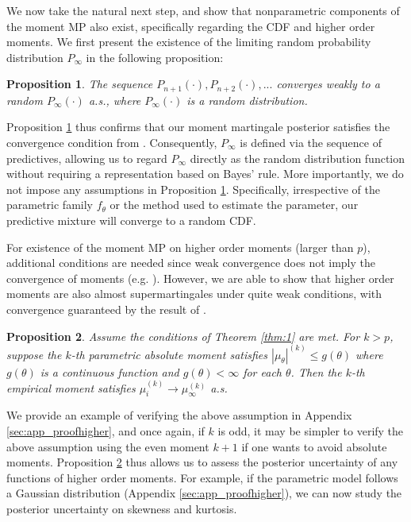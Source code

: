 \documentclass[11pt,a4paper]{article}
\theoremstyle{plain}
\newtheorem{prop}{Proposition}
\theoremstyle{remark}
\theoremstyle{remark}
\begin{document}
We now take the natural next step, and show that nonparametric components
of the moment MP also exist, specifically regarding the CDF and higher order moments. We first present the existence of the limiting random probability distribution $P_\infty$ in the following proposition: 
\begin{prop}\label{prop:exist} 
The sequence $P_{n+1}(\cdot),P_{n+2}(\cdot),...$ converges weakly to a random $P_{\infty}(\cdot)$ a.s., where $P_{\infty}(\cdot)$  is a random distribution.
\end{prop}


Proposition \ref{prop:exist} thus confirms that our moment martingale posterior satisfies the convergence condition from \cite{fong2023martingale}. Consequently, $P_\infty$ is defined via the sequence of predictives, allowing us to regard $P_\infty$ directly as the random distribution function without requiring a representation based on Bayes' rule. More importantly, we do not impose any assumptions in Proposition \ref{prop:exist}. Specifically, irrespective of the parametric family $f_\theta$ or the method used to estimate the parameter, our predictive mixture will converge to a random CDF.


For existence of the moment MP on higher order moments (larger than $p$), additional conditions are needed since weak convergence does not imply the convergence of moments (e.g. \cite{van2000}). However, we are able to show that higher order moments are also almost supermartingales under quite weak conditions, with convergence guaranteed by the result of \cite{robbins1971convergence}.
\begin{prop}\label{prop:higher} 
Assume the conditions of Theorem \ref{thm:1} are met. For $k > p$, suppose the $k$-th parametric absolute moment  satisfies
$|\mu_{\theta}|^{(k)} \leq g(\theta)$
where $g(\theta)$ is a continuous function and $g(\theta) < \infty$ for each $\theta$. Then the $k$-th empirical moment satisfies $\mu^{(k)}_i\to \mu^{(k)}_\infty$ a.s.
\end{prop}
We provide an example of verifying the above assumption in Appendix \ref{sec:app_proofhigher}, and once again, if $k$ is odd, it may be simpler to verify the above assumption using the even moment $k+1$ if one wants to avoid absolute moments. Proposition \ref{prop:higher} thus allows us to assess the posterior uncertainty of any functions of higher order moments. For example, if the parametric model follows a Gaussian distribution (Appendix \ref{sec:app_proofhigher}), we can now study the posterior uncertainty on skewness and kurtosis. 
\end{document}
